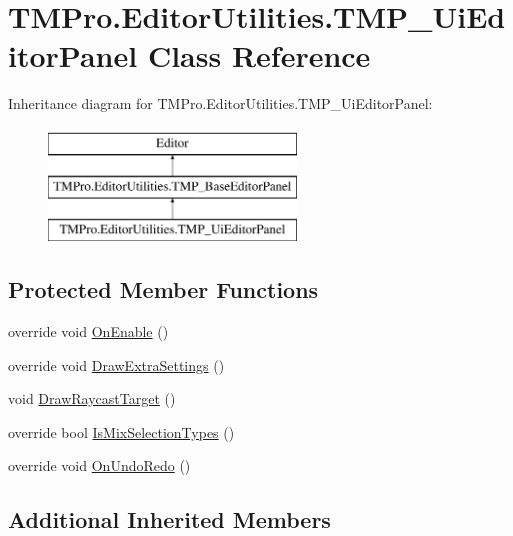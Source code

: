 \hypertarget{class_t_m_pro_1_1_editor_utilities_1_1_t_m_p___ui_editor_panel}{}\section{T\+M\+Pro.\+Editor\+Utilities.\+T\+M\+P\+\_\+\+Ui\+Editor\+Panel Class Reference}
\label{class_t_m_pro_1_1_editor_utilities_1_1_t_m_p___ui_editor_panel}
Inheritance diagram for T\+M\+Pro.\+Editor\+Utilities.\+T\+M\+P\+\_\+\+Ui\+Editor\+Panel\+:\begin{figure}[H]
\begin{center}
\leavevmode
\includegraphics[height=3.000000cm]{class_t_m_pro_1_1_editor_utilities_1_1_t_m_p___ui_editor_panel}
\end{center}
\end{figure}
\subsection*{Protected Member Functions}
\begin{DoxyCompactItemize}
\item 
override void \mbox{\hyperlink{class_t_m_pro_1_1_editor_utilities_1_1_t_m_p___ui_editor_panel_a24f0d3266f3db540b638e349e29793d9}{On\+Enable}} ()
\item 
override void \mbox{\hyperlink{class_t_m_pro_1_1_editor_utilities_1_1_t_m_p___ui_editor_panel_afa90d67bac7a60cd53401d2c8ed35de9}{Draw\+Extra\+Settings}} ()
\item 
void \mbox{\hyperlink{class_t_m_pro_1_1_editor_utilities_1_1_t_m_p___ui_editor_panel_adfa317e4e0f2ad1b0dc1c9b116e4cfb7}{Draw\+Raycast\+Target}} ()
\item 
override bool \mbox{\hyperlink{class_t_m_pro_1_1_editor_utilities_1_1_t_m_p___ui_editor_panel_abfd7483420d93f260bd25c932613f6db}{Is\+Mix\+Selection\+Types}} ()
\item 
override void \mbox{\hyperlink{class_t_m_pro_1_1_editor_utilities_1_1_t_m_p___ui_editor_panel_ae144f22de63b6a77615fde93e9b047a7}{On\+Undo\+Redo}} ()
\end{DoxyCompactItemize}
\subsection*{Additional Inherited Members}


